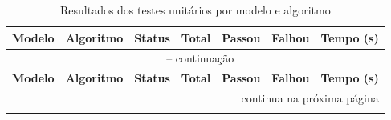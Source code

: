 \begin{longtable}{l l c c c c r}
  \caption{Resultados dos testes unitários por modelo e algoritmo} \\
  \toprule
  \textbf{Modelo} & \textbf{Algoritmo} & \textbf{Status} & \textbf{Total} & \textbf{Passou} & \textbf{Falhou} & \textbf{Tempo (s)} \\
  \midrule
  \endfirsthead

  \multicolumn{7}{c}{\tablename\ \thetable{} -- continuação} \\
  \toprule
  \textbf{Modelo} & \textbf{Algoritmo} & \textbf{Status} & \textbf{Total} & \textbf{Passou} & \textbf{Falhou} & \textbf{Tempo (s)} \\
  \midrule
  \endhead

  \midrule
  \multicolumn{7}{r}{\small continua na próxima página} \\
  \endfoot

  \bottomrule
  \endlastfoot


\end{longtable}
